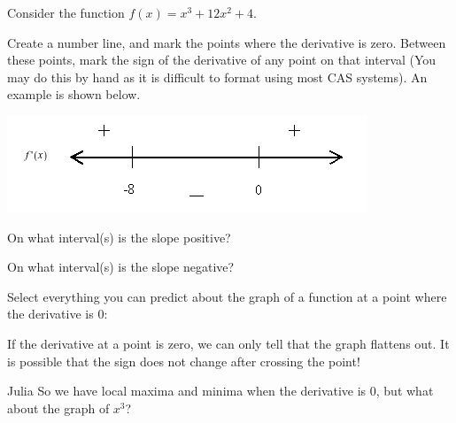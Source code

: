 \documentclass{ximera}
\begin{document}
\begin{question}
Consider the function $f(x)=x^3+12x^2+4$.

Create a number line, and mark the points where the derivative is zero. Between these points, mark the sign of the derivative of any point on that interval (You may do this by hand as it is difficult to format using most CAS systems). An example is shown below.

\begin{image}
\includegraphics{Numberline}
\end{image}

On what interval(s) is the slope positive?

\begin{selectAll}
\choice{$[-8, 0)$}
\choice{$(-\infty, 0]$}
\end{selectAll}

On what interval(s) is the slope negative?

\begin{selectAll}
\choice{$[-4, \infty)$}
\choice{$(-\infty, 0]$}
\end{selectAll}

Select everything you can predict about the graph of a function at a point where the derivative is 0:

\begin{selectAll}
\end{selectAll}
\begin{feedback}[correct]
If the derivative at a point is zero, we can only tell that the graph flattens out. It is possible that the sign does not change after crossing the point!
\end{feedback}
\end{question}

\begin{dialogue}
\item[Julia] So we have local maxima and minima when the derivative is 0, but what about the graph of $x^3$?
\end{dialogue}
\end{document}
